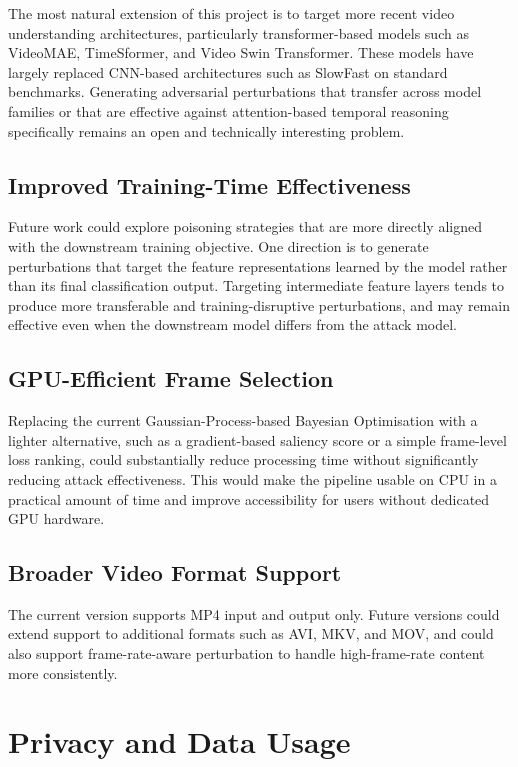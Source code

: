 The most natural extension of this project is to
target more recent video understanding architectures,
particularly transformer-based models such as
VideoMAE, TimeSformer, and Video Swin Transformer.
These models have largely replaced CNN-based
architectures such as SlowFast on standard benchmarks.
Generating adversarial perturbations that transfer
across model families or that are effective against
attention-based temporal reasoning specifically
remains an open and technically interesting problem.

\subsection{Improved Training-Time Effectiveness}

Future work could explore poisoning strategies that
are more directly aligned with the downstream training
objective. One direction is to generate perturbations
that target the feature representations learned by the
model rather than its final classification output.
Targeting intermediate feature layers tends to
produce more transferable and training-disruptive
perturbations, and may remain effective even when
the downstream model differs from the attack model.

\subsection{GPU-Efficient Frame Selection}

Replacing the current Gaussian-Process-based Bayesian
Optimisation with a lighter alternative, such as a
gradient-based saliency score or a simple frame-level
loss ranking, could substantially reduce processing
time without significantly reducing attack effectiveness.
This would make the pipeline usable on CPU in a
practical amount of time and improve accessibility
for users without dedicated GPU hardware.

\subsection{Broader Video Format Support}

The current version supports MP4 input and output only.
Future versions could extend support to additional
formats such as AVI, MKV, and MOV, and could also
support frame-rate-aware perturbation to handle
high-frame-rate content more consistently.

\section{Privacy and Data Usage}
\label{section:privacy}

